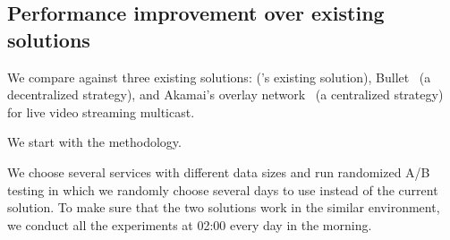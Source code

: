 

\subsection{Performance improvement over existing solutions}
\label{subsec:evaluation:centralized}

We compare \name against three existing solutions:
\alg (\company's existing solution),
Bullet~\cite{kostic2003bullet} (a decentralized  strategy), and
Akamai's overlay network~\cite{Andreev2013Designing} (a centralized strategy) for live video streaming
multicast.


We start with the methodology.

 We choose several services with different data sizes and run randomized A/B testing in which
we randomly choose several days to use \name instead of the current solution. To make sure that the two solutions work in the similar environment, we conduct all the experiments at 02:00 every day in the morning.

